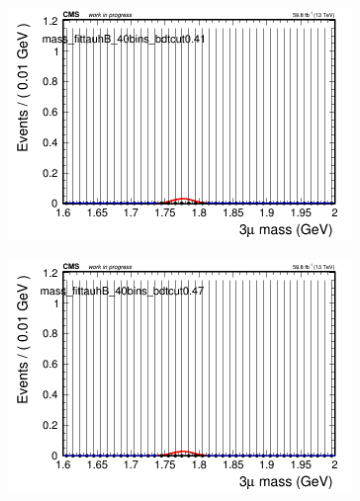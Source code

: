 \begin{figure}[H]
\begin{subfigure}{0.2\textwidth}
        \caption{}
    \end{subfigure}
    \begin{subfigure}{0.2\textwidth}
        \includegraphics[width=\textwidth]{unfixed_exp/plots/tauhB/massfit_tauhB_40bins_bdtcut0.41.png}
        \caption{}
    \end{subfigure}
    \begin{subfigure}{0.2\textwidth}
        \includegraphics[width=\textwidth]{unfixed_exp/plots/tauhB/massfit_tauhB_40bins_bdtcut0.47.png}
        \caption{}
    \end{subfigure}
    \begin{subfigure}{0.2\textwidth}

\end{subfigure}
\end{figure}
